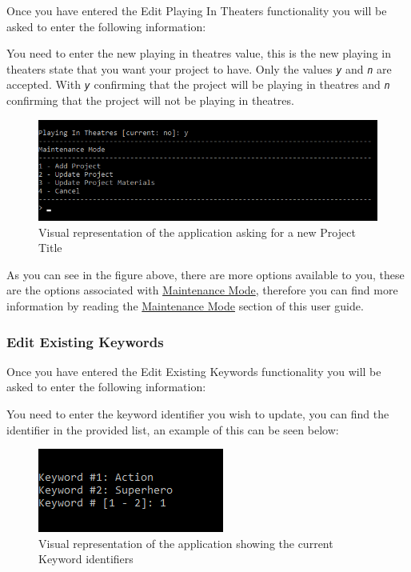 \documentclass[
  english,
  a4paper,
,tablecaptionabove
]{scrartcl}
\begin{document}
Once you have entered the Edit Playing In Theaters functionality you
will be asked to enter the following information:

You need to enter the new playing in theatres value, this is the new
playing in theaters state that you want your project to have. Only the
values \emph{\texttt{y}} and \emph{\texttt{n}} are accepted. With
\emph{\texttt{y}} confirming that the project will be playing in
theatres and \emph{\texttt{n}} confirming that the project will not be
playing in theatres.

\begin{figure}
\centering
\includegraphics{images/user-guide/maintenance-mode/update-project-playing-in-theaters.png}
\caption{Visual representation of the application asking for a new
Project Title}
\end{figure}

As you can see in the figure above, there are more options available to
you, these are the options associated with
\protect\hyperlink{using-maintenance-mode}{Maintenance Mode}, therefore
you can find more information by reading the
\protect\hyperlink{using-maintenance-mode}{Maintenance Mode} section of
this user guide.

\newpage

\hypertarget{edit-existing-keywords}{%
\subsubsection{Edit Existing Keywords}\label{edit-existing-keywords}}

Once you have entered the Edit Existing Keywords functionality you will
be asked to enter the following information:

You need to enter the keyword identifier you wish to update, you can
find the identifier in the provided list, an example of this can be seen
below:

\begin{figure}
\centering
\includegraphics{images/user-guide/maintenance-mode/update-project-select-keyword.png}
\caption{Visual representation of the application showing the current
Keyword identifiers}
\end{figure}
\end{document}
